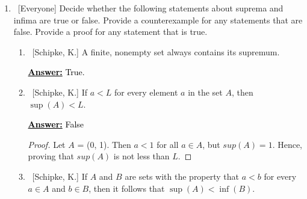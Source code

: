 \documentclass[10pt]{article}
\begin{document}
\begin{enumerate}
\begin{enumerate}
	We want an upper bound on $T$ that is smaller than $x$.  We can define $\varepsilon = x^2-2 > 0$.  We can then find $N \in \mathbb{N}$ such that $\frac{1}{N} < \varepsilon$, by the Archimedean Property.  Note that $\frac{1}{N^2} > 0$.
	
	Consider the quantity $$\left( x - \frac{1}{N} \right)^2.$$  Figure out what $N$ would need to be so that $\left( x - \frac{1}{N} \right)^2 > 2$.  Argue that $N > 0$.  Prove that $x - \frac{1}{N}$ is a smaller upper bound on $T$, and finish the proof.
 
	 \begin{proof}
     Consider the set $T = \{t \in \mathbb{R}: t^2 < 2\}$.  Let $x = \sup{(T)}$.  Suppose $x^2 > 2$. Define $\epsilon = x^2-2 > 0$. Then by the Archimedean Property, $\exists N \in \mathbb{N}: \frac{1}{N}<\epsilon$. Therefore $\frac{1}{N^2}<\frac{1}{N}<\epsilon$.  Since $x^2>2$ and $N>0$, then $(x - \frac{1}{N})^2 = x^2-2x*\frac{1}{N}+\frac{1}{N^2}>2$.  Since $x = sup(T)$ and $(x-\frac{1}{N})>2$, then $(x-\frac{1}{N})$ is a smaller upper bound of $T$.  Therefore x is not the least upper bound of $T$.  Hence, for the set $T = \{t \in \mathbb{R}: t^2 < 2\}$ with $x = \sup{(T)}$, $\exists x \in \mathbb{R}$ such that $x^2 =2$.
 \end{proof}
	\end{enumerate}
	

\item  ~[Everyone] Decide whether the following statements about suprema and infima are true or false.  Provide a counterexample for any statements that are false.  Provide a proof for any statement that is true.

	\begin{enumerate}
	
	\item  ~[Schipke, K.] A finite, nonempty set always contains its supremum.

\textbf{\textcolor{black}{\underline{Answer:}}}
\textcolor{black}{True.}
	\item  ~[Schipke, K.] If $a < L$ for every element $a$ in the set $A$, then $\sup{(A)} < L$.

\textbf{\textcolor{black}{\underline{Answer:}}}
\textcolor{black}{False}
\begin{proof}
Let $A$ = (0, 1).  Then $a < 1$ for all $a \in A$, but $sup(A) = 1$.  Hence, proving that $sup(A)$ is not less than $L$.
\end{proof}
	\item ~[Schipke, K.] If $A$ and $B$ are sets with the property that $a < b$ for every $a \in A$ and $b \in B$, then it follows that $\sup{(A)} < \inf{(B)}$.
 

\end{enumerate}
\end{enumerate}
\end{document}
